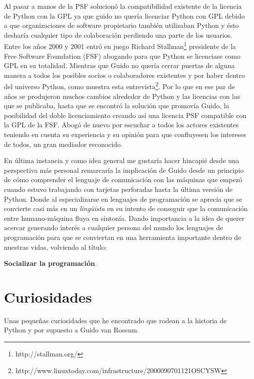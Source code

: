 \documentclass[11pt]{scrartcl}
\begin{document}
Al pasar a manos de la PSF solucionó la compatibilidad existente de la licencia de Python con la GPL ya que guido no quería licenciar Python con GPL debido a que organizaciones de software propietario también utilizaban Python y ésto desharía cualquier tipo de colaboración perdiendo una parte de los usuarios. Entre los años 2000 y 2001 entró en juego Richard Stallman\footnote{http://stallman.org/} presidente de la Free Software Foundation (FSF) abogando para que Python se licenciase como GPL en su totalidad. Mientras que Guido no quería cerrar puertas de alguna manera a todos los posibles socios o colaboradores existentes y por haber dentro del universo Python, como muestra esta entrevista\footnote{http://www.linuxtoday.com/infrastructure/2000090701121OSCYSW}. Por lo que en ese par de años se produjeron muchos cambios alrededor de Python y las licencias con las que se publicaba, hasta que se encontró la solución que promovía Guido, la posibilidad del doble licenciamiento creando así una licencia PSF compatible con la GPL de la FSF. Abogó de nuevo por escuchar a todos los actores existentes teniendo en cuenta su experiencia y su opinión para que confluyesen los intereses de todos, un gran mediador reconocido.

En última instancia y como idea general me gustaría hacer hincapié desde una perspectiva más personal remarcaría la implicación de Guido desde un principio de cómo comprender el lenguaje de comunicación con las máquinas que empezó cuando estuvo trabajando con tarjetas perforadas hasta la última versión de Python. Donde al especializarse en lenguajes de programación se aprecia que se convierte casi más en un \emph{lingüista} en su intento de conseguir que la comunicación entre humano-máquina fluya en sintonía. Dando importancia a la idea de querer acercar generando interés a cualquier persona del mundo los lenguajes de programación para que se conviertan en una herramienta importante dentro de nuestras vidas, volviendo al título:

\begin{center}
\textbf{Socializar la programación}.
\end{center}

\section{Curiosidades}

Unas pequeñas curiosidades que he encontrado que rodean a la historia de Python y por supuesto a Guido van Rossum.
\end{document}
